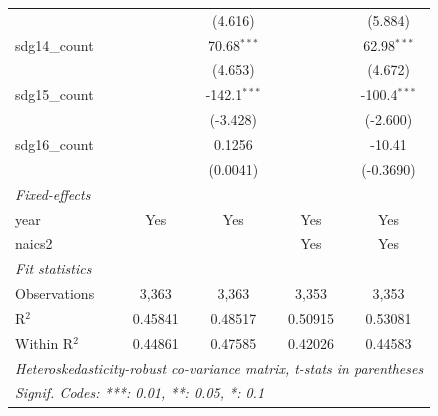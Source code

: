 \begin{tabular}{lcccc}
                     &                   & (4.616)           &                   & (5.884)\\   
   sdg14\_count      &                   & 70.68$^{***}$     &                   & 62.98$^{***}$\\   
                     &                   & (4.653)           &                   & (4.672)\\   
   sdg15\_count      &                   & -142.1$^{***}$    &                   & -100.4$^{***}$\\   
                     &                   & (-3.428)          &                   & (-2.600)\\   
   sdg16\_count      &                   & 0.1256            &                   & -10.41\\   
                     &                   & (0.0041)          &                   & (-0.3690)\\   
   \midrule
   \emph{Fixed-effects}\\
   year              & Yes               & Yes               & Yes               & Yes\\  
   naics2            &                   &                   & Yes               & Yes\\  
   \midrule
   \emph{Fit statistics}\\
   Observations      & 3,363             & 3,363             & 3,353             & 3,353\\  
   R$^2$             & 0.45841           & 0.48517           & 0.50915           & 0.53081\\  
   Within R$^2$      & 0.44861           & 0.47585           & 0.42026           & 0.44583\\  
   \midrule \midrule
   \multicolumn{5}{l}{\emph{Heteroskedasticity-robust co-variance matrix, t-stats in parentheses}}\\
   \multicolumn{5}{l}{\emph{Signif. Codes: ***: 0.01, **: 0.05, *: 0.1}}\\
\end{tabular}
\par\endgroup


